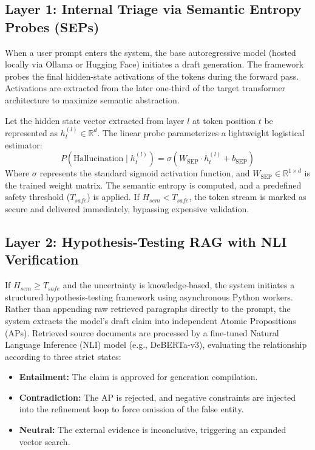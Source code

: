 \documentclass[11pt,a4paper]{article}
\begin{document}
\subsection{Layer 1: Internal Triage via Semantic Entropy Probes (SEPs)}
When a user prompt enters the system, the base autoregressive model (hosted locally via Ollama or Hugging Face) initiates a draft generation. The framework probes the final hidden-state activations of the tokens during the forward pass. Activations are extracted from the later one-third of the target transformer architecture to maximize semantic abstraction.

Let the hidden state vector extracted from layer $l$ at token position $t$ be represented as $h_t^{(l)} \in \mathbb{R}^d$. The linear probe parameterizes a lightweight logistical estimator:
\begin{equation}
P(\text{Hallucination} \mid h_t^{(l)}) = \sigma\left(W_{\text{SEP}} \cdot h_t^{(l)} + b_{\text{SEP}}\right)
\end{equation}
Where $\sigma$ represents the standard sigmoid activation function, and $W_{\text{SEP}} \in \mathbb{R}^{1 \times d}$ is the trained weight matrix. The semantic entropy is computed, and a predefined safety threshold ($T_{safe}$) is applied. If $H_{sem} < T_{safe}$, the token stream is marked as secure and delivered immediately, bypassing expensive validation.

\subsection{Layer 2: Hypothesis-Testing RAG with NLI Verification}
If $H_{sem} \ge T_{safe}$ and the uncertainty is knowledge-based, the system initiates a structured hypothesis-testing framework using asynchronous Python workers.
Rather than appending raw retrieved paragraphs directly to the prompt, the system extracts the model's draft claim into independent Atomic Propositions (APs). 
Retrieved source documents are processed by a fine-tuned Natural Language Inference (NLI) model (e.g., DeBERTa-v3), evaluating the relationship according to three strict states:
\begin{itemize}
    \item \textbf{Entailment:} The claim is approved for generation compilation.
    \item \textbf{Contradiction:} The AP is rejected, and negative constraints are injected into the refinement loop to force omission of the false entity.
    \item \textbf{Neutral:} The external evidence is inconclusive, triggering an expanded vector search.
\end{itemize}
\end{document}
